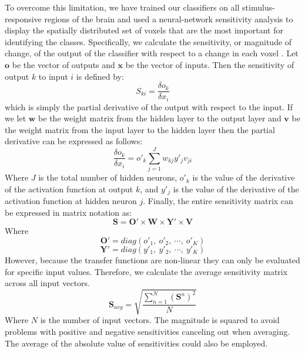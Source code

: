 \documentclass[preprint,5p,authoryear]{elsarticle}
\begin{document}
To overcome this limitation, we have trained our classifiers on all stimulus-responsive regions of the brain and used a neural-network sensitivity analysis to display the spatially distributed set of voxels that are the most important for identifying the classes.
Specifically, we calculate the sensitivity, or magnitude of change, of the output of the classifier with respect to a change in each voxel
 \citep{Zurada1994}.
Let $\mathbf{o}$ be the vector of outputs and $\mathbf{x}$ be the vector of inputs.
Then the sensitivity of output $k$ to input $i$ is defined by:
\begin{equation}
S_{ki} = \frac{\delta o_{k}}{\delta x_{i}}
\end{equation}
which is simply the partial derivative of the output with respect to the input.
If we let $\mathbf{w}$ be the weight matrix from the hidden layer to the output layer and $\mathbf{v}$ be the weight matrix from the input layer to the hidden layer then the partial derivative can be expressed as follows:
\begin{equation}
\frac{\delta o_{k}}{\delta x_{i}} = o'_{k} \sum^{J}_{j=1}{w_{kj}y'_{j}v_{ji}}
\end{equation}
Where $J$ is the total number of hidden neurons,  $o'_{k}$ is the value of the derivative of the activation function at output $k$, and $y'_{j}$ is the value of the derivative of the activation function at hidden neuron $j$.
Finally, the entire sensitivity matrix can be expressed in matrix notation as:
\begin{equation}
\mathbf{S} = \mathbf{O}' \times \mathbf{W} \times \mathbf{Y}' \times \mathbf{V}
\end{equation}
Where
\begin{equation}
\mathbf{O}' = diag(o'_{1},~o'_{2},~\cdots,~o'_{K})
\end{equation}
\begin{equation}
\mathbf{Y}' = diag(y'_{1},~y'_{2},~\cdots,~y'_{K})
\end{equation}
However, because the transfer functions are non-linear they can only be evaluated for specific input values.
Therefore, we calculate the average sensitivity matrix across all input vectors.
\begin{equation}
\mathbf{S}_{avg} = \sqrt{ \frac{ \sum_{n = 1}^{N}{ \left( \mathbf{S}^{n}\right)^{2} } }{N} }
\end{equation}
Where $N$ is the number of input vectors.
The magnitude is squared to avoid problems with positive and negative sensitivities canceling out when averaging.
The average of the absolute value of sensitivities could also be employed.
\end{document}
